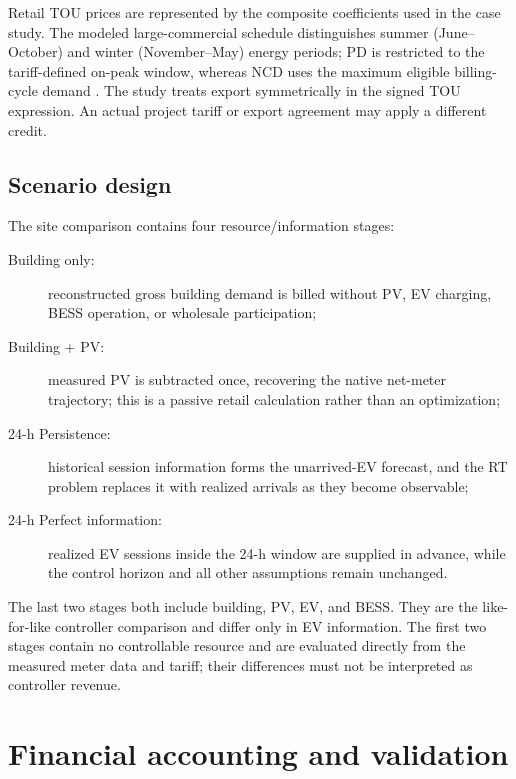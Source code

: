 \documentclass[final,5p,times]{elsarticle}
\begin{document}
Retail TOU prices are represented by the composite coefficients used in the
case study. The modeled large-commercial schedule distinguishes summer
(June--October) and winter (November--May) energy periods; PD is restricted to
the tariff-defined on-peak window, whereas NCD uses the maximum eligible
billing-cycle demand \cite{sdgeLargeCommercial2025} \cite{sdgeDemandGuide2026}. The
study treats export symmetrically in the signed TOU expression. An actual
project tariff or export agreement may apply a different credit.

\subsection{Scenario design}
The site comparison contains four resource/information stages:
\begin{description}
  \item[Building only:] reconstructed gross building demand is billed without PV, EV charging, BESS operation, or wholesale participation;
  \item[Building + PV:] measured PV is subtracted once, recovering the native net-meter trajectory; this is a passive retail calculation rather than an optimization;
  \item[24-h Persistence:] historical session information forms the unarrived-EV forecast, and the RT problem replaces it with realized arrivals as they become observable;
  \item[24-h Perfect information:] realized EV sessions inside the 24-h window are supplied in advance, while the control horizon and all other assumptions remain unchanged.
\end{description}
The last two stages both include building, PV, EV, and BESS. They are the like-for-like controller comparison and differ only in EV information. The first two stages contain no controllable resource and are evaluated directly from the measured meter data and tariff; their differences must not be interpreted as controller revenue.

\section{Financial accounting and validation}
\label{sec:accounting}
\end{document}
